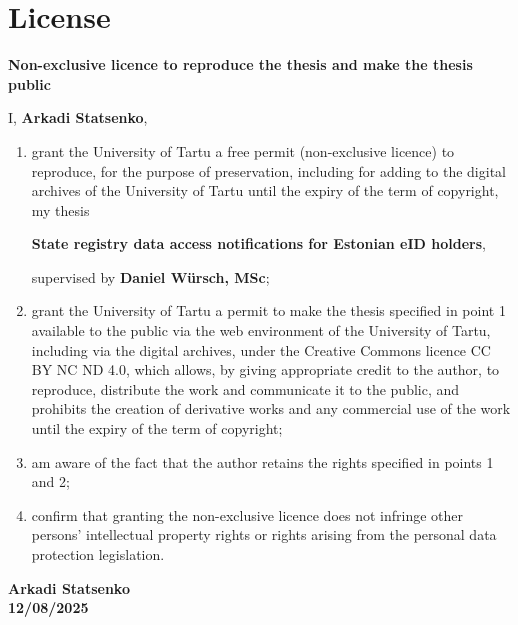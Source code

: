 \section*{License} \label{license} 

\textbf{Non-exclusive licence to reproduce the thesis and make the thesis public}

\vspace{1em}

I, \textbf{Arkadi Statsenko},

\vspace{0.5em}

\begin{enumerate}
    \item grant the University of Tartu a free permit (non-exclusive licence) to reproduce, for the purpose of preservation, including for adding to the digital archives of the University of Tartu until the expiry of the term of copyright, my thesis
    
    \textbf{State registry data access notifications for Estonian eID holders},
    
    supervised by \textbf{Daniel Würsch, MSc};
    
    \item grant the University of Tartu a permit to make the thesis specified in point 1 available to the public via the web environment of the University of Tartu, including via the digital archives, under the Creative Commons licence CC BY NC ND 4.0, which allows, by giving appropriate credit to the author, to reproduce, distribute the work and communicate it to the public, and prohibits the creation of derivative works and any commercial use of the work until the expiry of the term of copyright;
    
    \item am aware of the fact that the author retains the rights specified in points 1 and 2;
    
    \item confirm that granting the non-exclusive licence does not infringe other persons' intellectual property rights or rights arising from the personal data protection legislation.
\end{enumerate}

\vspace{2em}

\noindent
\textbf{Arkadi Statsenko} \\
\textbf{12/08/2025}

